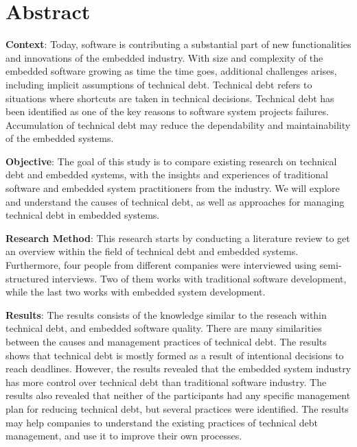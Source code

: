 

\section*{Abstract}
\textbf{Context}: Today, software is contributing a substantial part of new functionalities and innovations of the embedded industry. With size and complexity of the embedded software growing as time the time goes, additional challenges arises, including implicit assumptions of technical debt. Technical debt refers to situations where shortcuts are taken in technical decisions. Technical debt has been identified as one of the key reasons to software system projects failures. Accumulation of technical debt may reduce the dependability and maintainability of the embedded systems.

\textbf{Objective}: The goal of this study is to compare existing research on technical debt and embedded systems, with the insights and experiences of traditional software and embedded system practitioners from the industry. We will explore and understand the causes of technical debt, as well as approaches for managing technical debt in embedded systems.  

\textbf{Research Method}: This research starts by conducting a literature review to get an overview within the field of technical debt and embedded systems. Furthermore, four people from different companies were interviewed using semi-structured interviews. Two of them works with traditional software development, while the last two works with embedded system development. 

\textbf{Results}: The results consists of the knowledge similar to the reseach within technical debt, and embedded software quality. There are many similarities between the causes and management practices of technical debt. The results shows that technical debt is mostly formed as a result of intentional decisions to reach deadlines. However, the results revealed that the embedded system industry has more control over technical debt than traditional software industry. The results also revealed that neither of the participants had any specific management plan for reducing technical debt, but several practices were identified. The results may help companies to understand the existing practices of technical debt management, and use it to improve their own processes.